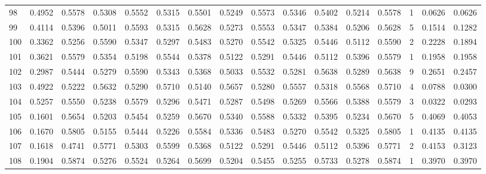 \begin{tabular}{lrrrrrrrrrrrrrrr}
98  &      0.4952 &  0.5578 &  0.5308 &  0.5552 &  0.5315 &  0.5501 &  0.5249 &  0.5573 &  0.5346 &  0.5402 &   0.5214 &     0.5578 &      1 &                    0.0626 &                     0.0626 \\
99  &      0.4114 &  0.5396 &  0.5011 &  0.5593 &  0.5315 &  0.5628 &  0.5273 &  0.5553 &  0.5347 &  0.5384 &   0.5206 &     0.5628 &      5 &                    0.1514 &                     0.1282 \\
100 &      0.3362 &  0.5256 &  0.5590 &  0.5347 &  0.5297 &  0.5483 &  0.5270 &  0.5542 &  0.5325 &  0.5446 &   0.5112 &     0.5590 &      2 &                    0.2228 &                     0.1894 \\
101 &      0.3621 &  0.5579 &  0.5354 &  0.5198 &  0.5544 &  0.5378 &  0.5122 &  0.5291 &  0.5446 &  0.5112 &   0.5396 &     0.5579 &      1 &                    0.1958 &                     0.1958 \\
102 &      0.2987 &  0.5444 &  0.5279 &  0.5590 &  0.5343 &  0.5368 &  0.5033 &  0.5532 &  0.5281 &  0.5638 &   0.5289 &     0.5638 &      9 &                    0.2651 &                     0.2457 \\
103 &      0.4922 &  0.5222 &  0.5632 &  0.5290 &  0.5710 &  0.5140 &  0.5657 &  0.5280 &  0.5557 &  0.5318 &   0.5568 &     0.5710 &      4 &                    0.0788 &                     0.0300 \\
104 &      0.5257 &  0.5550 &  0.5238 &  0.5579 &  0.5296 &  0.5471 &  0.5287 &  0.5498 &  0.5269 &  0.5566 &   0.5388 &     0.5579 &      3 &                    0.0322 &                     0.0293 \\
105 &      0.1601 &  0.5654 &  0.5203 &  0.5454 &  0.5259 &  0.5670 &  0.5340 &  0.5588 &  0.5332 &  0.5395 &   0.5234 &     0.5670 &      5 &                    0.4069 &                     0.4053 \\
106 &      0.1670 &  0.5805 &  0.5155 &  0.5444 &  0.5226 &  0.5584 &  0.5336 &  0.5483 &  0.5270 &  0.5542 &   0.5325 &     0.5805 &      1 &                    0.4135 &                     0.4135 \\
107 &      0.1618 &  0.4741 &  0.5771 &  0.5303 &  0.5599 &  0.5368 &  0.5122 &  0.5291 &  0.5446 &  0.5112 &   0.5396 &     0.5771 &      2 &                    0.4153 &                     0.3123 \\
108 &      0.1904 &  0.5874 &  0.5276 &  0.5524 &  0.5264 &  0.5699 &  0.5204 &  0.5455 &  0.5255 &  0.5733 &   0.5278 &     0.5874 &      1 &                    0.3970 &                     0.3970 \\

\end{tabular}

